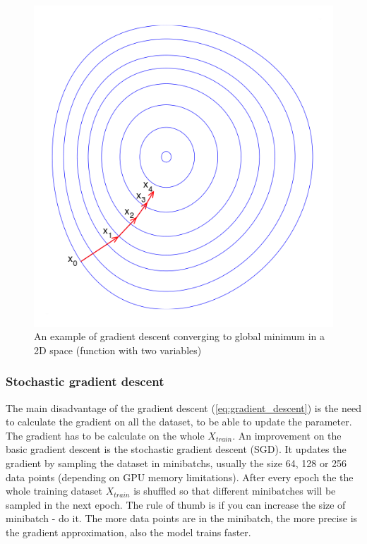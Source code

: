 \documentclass[times, utf8, diplomski]{fer}
\begin{document}
\begin{figure}
  \includegraphics[scale=0.5]{figures/gradient_descent.png}
  \centering
  \caption{An example of gradient descent converging to global minimum in a 2D space (function with two variables)}
  \label{fig:local_and_global_function_values}
\end{figure}

\subsubsection{Stochastic gradient descent}
\label{se:stochastic_gd}

The main disadvantage of the gradient descent (\ref{eq:gradient_descent}) is the need to calculate the gradient on all the dataset, to be able to update the parameter. The gradient has to be calculate on the whole $X_{train}$. An improvement on the basic gradient descent is the stochastic gradient descent (SGD). It updates the gradient by sampling the dataset in minibatchs, usually the size 64, 128 or 256 data points (depending on GPU memory limitations). After every epoch the the whole training dataset $X_{train}$ is shuffled so that different minibatches will be sampled in the next epoch. The rule of thumb is if you can increase the size of minibatch - do it. The more data points are in the minibatch, the more precise is the gradient approximation, also the model trains faster.
\end{document}

